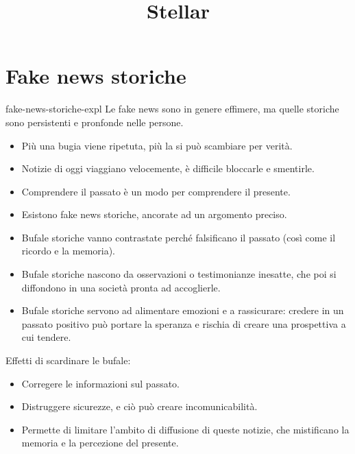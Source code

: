 \documentclass[preview]{standalone}
\begin{document}
\title{Stellar}
\genpage

\section{Fake news storiche}


\begin{snippet}{fake-news-storiche-expl}
    Le fake news sono in genere effimere, ma quelle storiche sono persistenti e
    pronfonde nelle persone.

    \begin{itemize}
        \item Più una bugia viene ripetuta, più la si può scambiare per verità.
        \item Notizie di oggi viaggiano velocemente, è difficile bloccarle e smentirle.
        \item Comprendere il passato è un modo per comprendere il presente.
        \item Esistono fake news storiche, ancorate ad un argomento preciso.
        \item Bufale storiche vanno contrastate perché falsificano il passato (così come il ricordo e la memoria).
        \item Bufale storiche nascono da osservazioni o testimonianze inesatte, che poi si diffondono in una società pronta ad accoglierle.
        \item Bufale storiche servono ad alimentare emozioni e a rassicurare: credere in un passato positivo può portare la speranza e rischia di creare una prospettiva a cui tendere.
    \end{itemize}

    Effetti di scardinare le bufale:

    \begin{itemize}
        \item Corregere le informazioni sul passato.
        \item Distruggere sicurezze, e ciò può creare incomunicabilità.
        \item Permette di limitare l'ambito di diffusione di queste notizie, che mistificano la memoria e la percezione del presente.
    \end{itemize}
\end{snippet}
\end{document}
